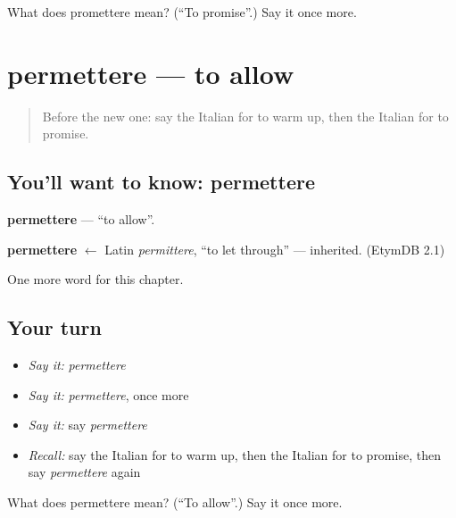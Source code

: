 \begin{tcolorbox}[breakable,colback=teal!4,colframe=teal!35!black,title={Before you move on}]
What does promettere mean? (\textquotedblleft{}To promise\textquotedblright{}.) Say it once more.
\end{tcolorbox}
\section[permettere]{permettere — to allow}

\label{lesson:IT-C177-permettere}



\begin{quote}
Before the new one: say the Italian for to warm up, then the Italian for to promise.
\end{quote}

\subsection*{You'll want to know: permettere}
\textbf{permettere} — \textquotedblleft{}to allow\textquotedblright{}.

\begin{cousinweb}
\textbf{permettere} $\leftarrow$ Latin \emph{permittere}, \textquotedblleft{}to let through\textquotedblright{} — inherited. (EtymDB 2.1)
\end{cousinweb}

\begin{grammarlens}[title={What you've built}]
One more word for this chapter.
\end{grammarlens}

\subsection*{Your turn}
\begin{itemize}
\raggedright
  \item \emph{Say it:} \emph{permettere}
  \item \emph{Say it:} \emph{permettere}, once more
  \item \emph{Say it:} say \emph{permettere}
  \item \emph{Recall:} say the Italian for to warm up, then the Italian for to promise, then say \emph{permettere} again
\end{itemize}

\begin{tcolorbox}[breakable,colback=teal!4,colframe=teal!35!black,title={Before you move on}]
What does permettere mean? (\textquotedblleft{}To allow\textquotedblright{}.) Say it once more.
\end{tcolorbox}
